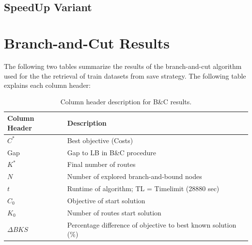 \subsection{SpeedUp Variant}
\label{app:subsec:parameterstudy_SpeedUp}

\clearpage
\section{Branch-and-Cut Results}

The following two tables summarize the results of the branch-and-cut algorithm used for the the retrieval of train datasets
from save strategy. The following table explains each column header:

\begin{table}[ht]
    \centering
    \begin{tabular}{C{0.2\textwidth}C{0.74\textwidth}}
        \toprule
        Column Header & Description                                                    \\
        \midrule
        $C^*$         & Best objective (Costs)                                         \\
        Gap           & Gap to \gls{LB} in B\&C procedure                              \\
        $K^*$         & Final number of routes                                         \\
        $N$           & Number of explored branch-and-bound nodes                      \\
        $t$           & Runtime of algorithm; TL = Timelimit (28880 sec)               \\
        $C_0$         & Objective of start solution                                    \\
        $K_0$         & Number of routes start solution                                \\
        $\Delta BKS$  & Percentage difference of objective to best known solution (\%) \\
        \bottomrule
    \end{tabular}
    \caption{Column header description for B\&C results.}
    \label{tab:column_header_description_bc}
\end{table}

